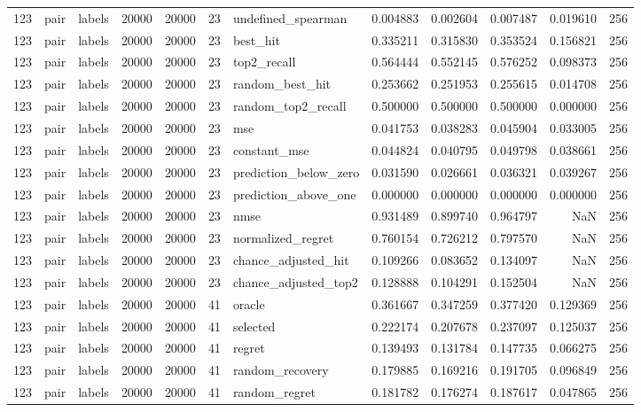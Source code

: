 \begin{tabular}{rllrrrlrrrrr}
123 & pair & labels & 20000 & 20000 & 23 & undefined_spearman & 0.004883 & 0.002604 & 0.007487 & 0.019610 & 256 \\
123 & pair & labels & 20000 & 20000 & 23 & best_hit & 0.335211 & 0.315830 & 0.353524 & 0.156821 & 256 \\
123 & pair & labels & 20000 & 20000 & 23 & top2_recall & 0.564444 & 0.552145 & 0.576252 & 0.098373 & 256 \\
123 & pair & labels & 20000 & 20000 & 23 & random_best_hit & 0.253662 & 0.251953 & 0.255615 & 0.014708 & 256 \\
123 & pair & labels & 20000 & 20000 & 23 & random_top2_recall & 0.500000 & 0.500000 & 0.500000 & 0.000000 & 256 \\
123 & pair & labels & 20000 & 20000 & 23 & mse & 0.041753 & 0.038283 & 0.045904 & 0.033005 & 256 \\
123 & pair & labels & 20000 & 20000 & 23 & constant_mse & 0.044824 & 0.040795 & 0.049798 & 0.038661 & 256 \\
123 & pair & labels & 20000 & 20000 & 23 & prediction_below_zero & 0.031590 & 0.026661 & 0.036321 & 0.039267 & 256 \\
123 & pair & labels & 20000 & 20000 & 23 & prediction_above_one & 0.000000 & 0.000000 & 0.000000 & 0.000000 & 256 \\
123 & pair & labels & 20000 & 20000 & 23 & nmse & 0.931489 & 0.899740 & 0.964797 & NaN & 256 \\
123 & pair & labels & 20000 & 20000 & 23 & normalized_regret & 0.760154 & 0.726212 & 0.797570 & NaN & 256 \\
123 & pair & labels & 20000 & 20000 & 23 & chance_adjusted_hit & 0.109266 & 0.083652 & 0.134097 & NaN & 256 \\
123 & pair & labels & 20000 & 20000 & 23 & chance_adjusted_top2 & 0.128888 & 0.104291 & 0.152504 & NaN & 256 \\
123 & pair & labels & 20000 & 20000 & 41 & oracle & 0.361667 & 0.347259 & 0.377420 & 0.129369 & 256 \\
123 & pair & labels & 20000 & 20000 & 41 & selected & 0.222174 & 0.207678 & 0.237097 & 0.125037 & 256 \\
123 & pair & labels & 20000 & 20000 & 41 & regret & 0.139493 & 0.131784 & 0.147735 & 0.066275 & 256 \\
123 & pair & labels & 20000 & 20000 & 41 & random_recovery & 0.179885 & 0.169216 & 0.191705 & 0.096849 & 256 \\
123 & pair & labels & 20000 & 20000 & 41 & random_regret & 0.181782 & 0.176274 & 0.187617 & 0.047865 & 256 \\

\end{tabular}
